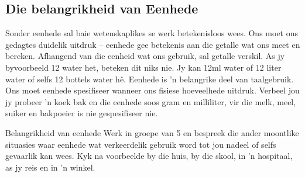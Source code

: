 \subsection*{Die belangrikheid van Eenhede}
            \nopagebreak
Sonder eenhede sal baie wetenskaplikes se werk betekenisloos wees. Ons moet ons gedagtes duidelik uitdruk – eenhede gee betekenis aan die getalle wat ons meet en bereken. Afhangend van die eenheid wat ons gebruik, sal getalle verskil. As jy byvoorbeeld 12 water het, beteken dit niks nie. Jy kan 12ml water of 12 liter water of selfs 12 bottels water hê. Eenhede is  'n belangrike deel van taalgebruik. Ons moet eenhede spesifiseer wanneer ons fisiese hoeveelhede uitdruk. Verbeel jou jy probeer  'n koek bak en die eenhede soos gram en milliliter, vir die melk, meel, suiker en bakpoeier is nie gespesifiseer nie.
\begin{groupdiscussion}{Belangrikheid van eenhede}
            \nopagebreak
Werk in groepe van 5 en bespreek die ander moontlike situasies waar eenhede wat verkeerdelik gebruik word tot jou nadeel of selfs gevaarlik kan wees. Kyk na voorbeelde by die huis, by die skool, in  'n hospitaal, as jy reis en in  'n winkel.
\end{groupdiscussion}
